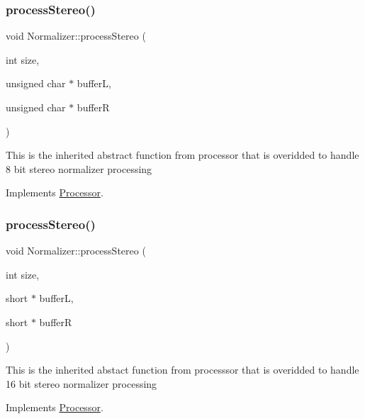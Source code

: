 \subsubsection{\texorpdfstring{process\+Stereo()}{processStereo()}\hspace{0.1cm}{\footnotesize\ttfamily [1/2]}}
{\footnotesize\ttfamily void Normalizer\+::process\+Stereo (\begin{DoxyParamCaption}\item[{int}]{size,  }\item[{unsigned char $\ast$}]{bufferL,  }\item[{unsigned char $\ast$}]{bufferR }\end{DoxyParamCaption})\hspace{0.3cm}{\ttfamily [virtual]}}

This is the inherited abstract function from processor that is overidded to handle 8 bit stereo normalizer processing 

Implements \hyperlink{classProcessor_a9b3db1d1810308706285c3ffd1f6d28c}{Processor}.

\mbox{\label{classNormalizer_a8a907de202a6f1173cd2ee8b7266971e}} 
\subsubsection{\texorpdfstring{process\+Stereo()}{processStereo()}\hspace{0.1cm}{\footnotesize\ttfamily [2/2]}}
{\footnotesize\ttfamily void Normalizer\+::process\+Stereo (\begin{DoxyParamCaption}\item[{int}]{size,  }\item[{short $\ast$}]{bufferL,  }\item[{short $\ast$}]{bufferR }\end{DoxyParamCaption})\hspace{0.3cm}{\ttfamily [virtual]}}

This is the inherited abstact function from processsor that is overidded to handle 16 bit stereo normalizer processing 

Implements \hyperlink{classProcessor_a705ddc9aa4c2400a30691fc9888c8e9e}{Processor}.

\mbox{\label{classNormalizer_aadfdabbf13c93c2775f99ddef9ebe6b9}} 
